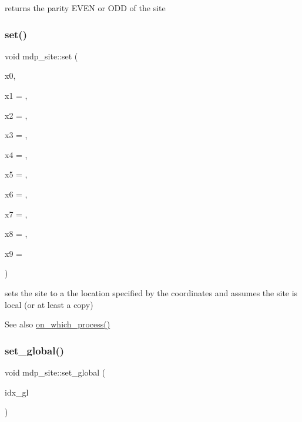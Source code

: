 returns the parity E\+V\+EN or O\+DD of the site 

\mbox{\label{classmdp__site_a241eb259576cbe7354d1ff714d22416c}} 
\subsubsection{\texorpdfstring{set()}{set()}}
{\footnotesize\ttfamily void mdp\+\_\+site\+::set (\begin{DoxyParamCaption}\item[{int}]{x0,  }\item[{int}]{x1 = {},  }\item[{int}]{x2 = {},  }\item[{int}]{x3 = {},  }\item[{int}]{x4 = {},  }\item[{int}]{x5 = {},  }\item[{int}]{x6 = {},  }\item[{int}]{x7 = {},  }\item[{int}]{x8 = {},  }\item[{int}]{x9 = {} }\end{DoxyParamCaption})\hspace{0.3cm}{\ttfamily [inline]}}

sets the site to a the location specified by the coordinates and assumes the site is local (or at least a copy) \begin{DoxySeeAlso}{See also}
\hyperlink{classmdp__site_ac96405ecdb78dc33d55edea04876a931}{on\+\_\+which\+\_\+process()} 
\end{DoxySeeAlso}
\mbox{\label{classmdp__site_ad0b34065c28aa0abaaf5b742b459bc77}} 
\subsubsection{\texorpdfstring{set\+\_\+global()}{set\_global()}}
{\footnotesize\ttfamily void mdp\+\_\+site\+::set\+\_\+global (\begin{DoxyParamCaption}\item[{\hyperlink{mdp__global__vars_8h_aaa1ad9d0dcd2124aa5af0120d9954174}{mdp\+\_\+int}}]{idx\+\_\+gl }\end{DoxyParamCaption})\hspace{0.3cm}{\ttfamily [inline]}}



